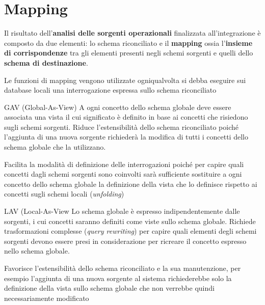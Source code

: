 \section{Mapping}\label{sec:db_mapping} %
Il risultato dell'\textbf{analisi delle sorgenti operazionali} finalizzata all'integrazione è composto da due elementi: lo schema riconciliato e il \textbf{mapping} ossia l'\textbf{insieme di corrispondenze} tra gli elementi presenti negli schemi sorgenti e quelli dello \textbf{schema di destinazione}.
\begin{note}
    Le funzioni di mapping vengono utilizzate ogniqualvolta si debba eseguire sui database locali una interrogazione espressa sullo schema riconciliato
\end{note}
\begin{definition}{GAV (Global-As-View)}{}
    A ogni concetto dello schema globale deve essere associata una vista il cui significato è definito in base ai concetti che risiedono sugli schemi sorgenti.
    Riduce l'estensibilità dello schema riconciliato poiché l'aggiunta di una nuova sorgente richiederà la modifica di tutti i concetti dello schema globale che la utilizzano.
    \begin{note}
        Facilita la modalità di definizione delle interrogazioni poiché per capire quali concetti dagli schemi sorgenti sono coinvolti sarà sufficiente sostituire a ogni concetto dello schema globale la definizione della vista che lo definisce rispetto ai concetti sugli schemi locali (\textit{unfolding})
    \end{note}
\end{definition}
\begin{definition}{LAV (Local-As-View}{}
    Lo schema globale è espresso indipendentemente dalle sorgenti, i cui concetti saranno definiti come viste sullo schema globale.
    Richiede trasformazioni complesse (\textit{query rewriting}) per capire quali elementi degli schemi sorgenti devono essere presi in considerazione per ricreare il concetto espresso nello schema globale.
    \begin{note}
        Favorisce l'estensibilità dello schema riconciliato e la sua manutenzione, per esempio l'aggiunta di una nuova sorgente al sistema richiederebbe solo la definizione della vista sullo schema globale che non verrebbe quindi necessariamente modificato
    \end{note}
\end{definition}
%
